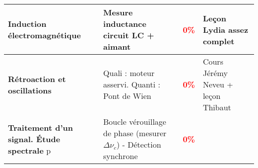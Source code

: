\begin{changemargin}{-1.5cm}{-0cm}
\begin{center}
\begin{tabularx}{\paperwidth-2cm}{| X | X | c | X |}
  \hline 
  \textbf{Induction électromagnétique} & Mesure inductance circuit LC + aimant & \textcolor{red}{\textbf{0\%}} & Leçon Lydia assez complet\\
  \hline
  \textbf{Rétroaction et oscillations} & Quali : moteur asservi. Quanti : Pont de Wien & \textcolor{red}{\textbf{0\%}} & Cours Jérémy Neveu + leçon Thibaut\\
  \hline
  \textbf{Traitement d'un signal. Étude spectrale} p\pageref{LP_TraitementSignal} & Boucle vérouillage de phase (mesurer $\Delta \nu_c$) - Détection synchrone & \textcolor{red}{\textbf{0\%}} & \\
  \hline
  
\end{tabularx}
\end{center}






\end{changemargin}
